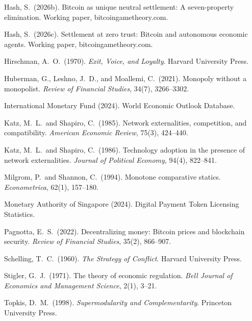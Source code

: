 \documentclass[12pt]{article}
\theoremstyle{definition}
\theoremstyle{remark}
\begin{document}
\begin{description}[style=nextline,leftmargin=0pt,labelsep=0pt,font=\normalfont]
\item Hash, S.\ (2026b). Bitcoin as unique neutral settlement: A seven-property
elimination. Working paper, bitcoingametheory.com.

\item Hash, S.\ (2026c). Settlement at zero trust: Bitcoin and autonomous economic
agents. Working paper, bitcoingametheory.com.

\item Hirschman, A.\ O.\ (1970). \emph{Exit, Voice, and Loyalty}. Harvard
University Press.

\item Huberman, G., Leshno, J.\ D., and Moallemi, C.\ (2021). Monopoly without
a monopolist. \emph{Review of Financial Studies}, 34(7), 3266--3302.

\item International Monetary Fund (2024). World Economic Outlook Database.

\item Katz, M.\ L.\ and Shapiro, C.\ (1985). Network externalities, competition,
and compatibility. \emph{American Economic Review}, 75(3), 424--440.

\item Katz, M.\ L.\ and Shapiro, C.\ (1986). Technology adoption in the presence
of network externalities. \emph{Journal of Political Economy}, 94(4), 822--841.

\item Milgrom, P.\ and Shannon, C.\ (1994). Monotone comparative statics.
\emph{Econometrica}, 62(1), 157--180.

\item Monetary Authority of Singapore (2024). Digital Payment Token Licensing
Statistics.

\item Pagnotta, E.\ S.\ (2022). Decentralizing money: Bitcoin prices and
blockchain security. \emph{Review of Financial Studies}, 35(2), 866--907.

\item Schelling, T.\ C.\ (1960). \emph{The Strategy of Conflict}. Harvard
University Press.

\item Stigler, G.\ J.\ (1971). The theory of economic regulation. \emph{Bell
Journal of Economics and Management Science}, 2(1), 3--21.

\item Topkis, D.\ M.\ (1998). \emph{Supermodularity and Complementarity}.
Princeton University Press.

\end{description}
\end{document}
